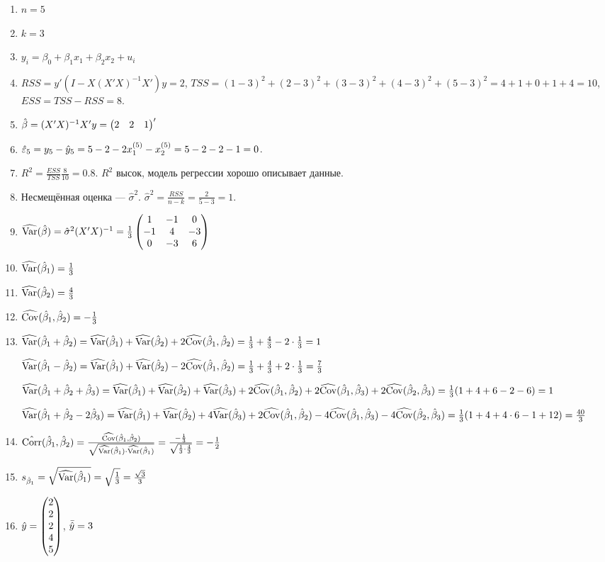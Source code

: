 \begin{problem}
\begin{sol}
\begin{enumerate}
\item $n=5$
\item $k=3$
\item $y_i=\beta_0+\beta_1x_1+\beta_2x_2+u_i$
\item $RSS=y'(I-X(X'X)^{-1}X')y=2$, $TSS=(1-3)^2+(2-3)^2+(3-3)^2+(4-3)^2+(5-3)^2=4+1+0+1+4=10$, $ESS=TSS-RSS=8$.
\item $\hat{\beta}=(X'X)^{-1}X'y=\begin{pmatrix}2 & 2 & 1\end{pmatrix}'$
\item $\hat{\varepsilon}_5=y_5-\hat{y}_5=5-2-2x^{(5)}_1-x^{(5)}_2=5-2-2-1=0$.
\item $R^2=\frac{ESS}{TSS}\frac{8}{10}=0.8$. $R^2$ высок, модель регрессии хорошо описывает данные.
\item Несмещённая оценка — $\hat\sigma^2$. $\hat\sigma^2=\frac{RSS}{n-k}=\frac{2}{5-3}=1$.
\item $\widehat{\operatorname{Var}}(\hat{\beta})=\hat\sigma^2(X'X)^{-1}=\frac13\begin{pmatrix}
1&-1&0\\
-1&4&-3\\
0&-3&6
\end{pmatrix}
$
\item $\widehat{\operatorname{Var}}(\hat\beta_1)=\frac13$
\item $\widehat{\operatorname{Var}}(\hat\beta_2)=\frac43$
\item $\widehat{\operatorname{Cov}}(\hat\beta_1,\hat\beta_2)=-\frac13$
\item $\widehat{\operatorname{Var}}(\hat\beta_1+\hat\beta_2)=\widehat{\operatorname{Var}}(\hat\beta_1)+\widehat{\operatorname{Var}}(\hat\beta_2)+2\widehat{\operatorname{Cov}}(\hat\beta_1,\hat\beta_2)=\frac13+\frac43-2\cdot\frac13=1$

$\widehat{\operatorname{Var}}(\hat\beta_1-\hat\beta_2)=\widehat{\operatorname{Var}}(\hat\beta_1)+\widehat{\operatorname{Var}}(\hat\beta_2)-2\widehat{\operatorname{Cov}}(\hat\beta_1,\hat\beta_2)=\frac13+\frac43+2\cdot\frac13=\frac73$

$\widehat{\operatorname{Var}}(\hat\beta_1+\hat\beta_2+\hat\beta_3)=\widehat{\operatorname{Var}}(\hat\beta_1)+\widehat{\operatorname{Var}}(\hat\beta_2)+\widehat{\operatorname{Var}}(\hat\beta_3)+2\widehat{\operatorname{Cov}}(\hat\beta_1,\hat\beta_2)+2\widehat{\operatorname{Cov}}(\hat\beta_1,\hat\beta_3)+2\widehat{\operatorname{Cov}}(\hat\beta_2,\hat\beta_3)=\frac13(1+4+6-2-6)=1$

$\widehat{\operatorname{Var}}(\hat\beta_1+\hat\beta_2-2\hat\beta_3)=\widehat{\operatorname{Var}}(\hat\beta_1)+\widehat{\operatorname{Var}}(\hat\beta_2)+4\widehat{\operatorname{Var}}(\hat\beta_3)+2\widehat{\operatorname{Cov}}(\hat\beta_1,\hat\beta_2)-4\widehat{\operatorname{Cov}}(\hat\beta_1,\hat\beta_3)-4\widehat{\operatorname{Cov}}(\hat\beta_2,\hat\beta_3)=\frac13(1+4+4\cdot 6-1+12)=\frac{40}{3}$
\item $\hat{\operatorname{Corr}}(\hat\beta_1,\hat\beta_2)=\frac{\widehat{\operatorname{Cov}}(\hat\beta_1,\hat\beta_2)}{\sqrt{\widehat{\operatorname{Var}}(\hat\beta_1)\cdot\widehat{\operatorname{Var}}(\hat\beta_1)}}=\frac{-\frac13}{\sqrt{\frac13\cdot\frac43}}=-\frac12$
\item $s_{\hat\beta_1}=\sqrt{\widehat{\operatorname{Var}}(\hat\beta_1)}=\sqrt{\frac13}=\frac{\sqrt3}{3}$
\item $\hat{y}=\begin{pmatrix}
2\\
2\\
2\\
4\\
5
\end{pmatrix}$, $\bar {\hat{y}}=3$


\end{enumerate}
\end{sol}
\end{problem}
